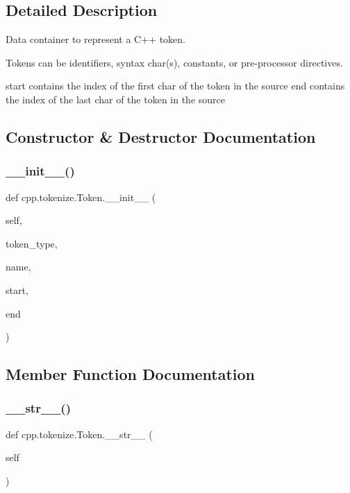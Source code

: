 \subsection{Detailed Description}
\begin{DoxyVerb}Data container to represent a C++ token.

Tokens can be identifiers, syntax char(s), constants, or
pre-processor directives.

start contains the index of the first char of the token in the source
end contains the index of the last char of the token in the source
\end{DoxyVerb}
 

\subsection{Constructor \& Destructor Documentation}
\mbox{\label{classcpp_1_1tokenize_1_1Token_a7da7659a5a6c61d0f4b8590cf96e19fd}} 
\subsubsection{\texorpdfstring{\_\_init\_\_()}{\_\_init\_\_()}}
{\footnotesize\ttfamily def cpp.\+tokenize.\+Token.\+\_\+\+\_\+init\+\_\+\+\_\+ (\begin{DoxyParamCaption}\item[{}]{self,  }\item[{}]{token\+\_\+type,  }\item[{}]{name,  }\item[{}]{start,  }\item[{}]{end }\end{DoxyParamCaption})}



\subsection{Member Function Documentation}
\mbox{\label{classcpp_1_1tokenize_1_1Token_a98e024051039637a18601fcbb0232cc2}} 
\subsubsection{\texorpdfstring{\_\_str\_\_()}{\_\_str\_\_()}}
{\footnotesize\ttfamily def cpp.\+tokenize.\+Token.\+\_\+\+\_\+str\+\_\+\+\_\+ (\begin{DoxyParamCaption}\item[{}]{self }\end{DoxyParamCaption})}



